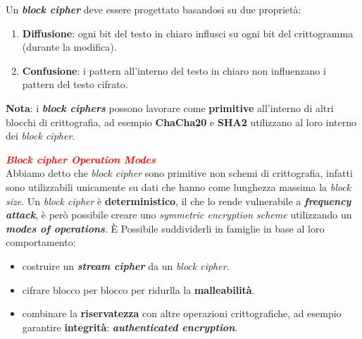 \begin{flushleft}
    \medskip
    
    Un \textbf{\textit{block cipher}} deve essere progettato basandosi su due proprietà:
    \begin{enumerate}[nosep]
        \item \textbf{Diffusione}: ogni bit del testo in chiaro influsci su ogni bit del crittogramma (durante la modifica).
        \item \textbf{Confusione}: i pattern all'interno del testo in chiaro non influenzano i pattern del testo cifrato.
    \end{enumerate}

    \textbf{Nota}: i \textbf{\textit{block ciphers}} possono lavorare come \textbf{primitive} all'interno di altri blocchi di crittografia, ad esempio \textbf{ChaCha20} e \textbf{SHA2} utilizzano al loro interno dei \textit{block cipher}.
\end{flushleft}

\begin{flushleft}
    \textcolor{red}{\textbf{\textit{Block cipher Operation Modes}}} \\
    Abbiamo detto che \textit{block cipher} sono primitive non schemi di crittografia, infatti sono utilizzabili unicamente su dati che hanno come lunghezza massima la \textit{block size}. Un \textit{block cipher} è \textbf{deterministico}, il che lo rende vulnerabile a \textbf{\textit{frequency attack}}, è però possibile creare uno \textit{symmetric encryption scheme} utilizzando un \textbf{\textit{modes of operations}}. È Possibile suddividerli in famiglie in base al loro comportamento:
    \begin{itemize}[nosep]
        \item costruire un \textbf{\textit{stream cipher}} da un \textit{block cipher}.
        \item cifrare blocco per blocco per ridurlla la \textbf{malleabilità}.
        \item combinare la \textbf{riservatezza} con altre operazioni crittografiche, ad esempio garantire \textbf{integrità}: \textbf{\textit{authenticated encryption}}.
    \end{itemize}
\end{flushleft}

